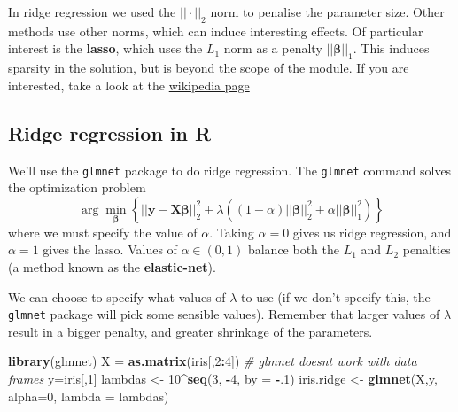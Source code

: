 \documentclass[
]{book}
\newenvironment{Shaded}{\begin{snugshade}}{\end{snugshade}}
\newcommand{\AttributeTok}[1]{\textcolor[rgb]{0.13,0.29,0.53}{#1}}
\newcommand{\CommentTok}[1]{\textcolor[rgb]{0.56,0.35,0.01}{\textit{#1}}}
\newcommand{\DecValTok}[1]{\textcolor[rgb]{0.00,0.00,0.81}{#1}}
\newcommand{\FunctionTok}[1]{\textcolor[rgb]{0.13,0.29,0.53}{\textbf{#1}}}
\newcommand{\NormalTok}[1]{#1}
\newcommand{\OtherTok}[1]{\textcolor[rgb]{0.56,0.35,0.01}{#1}}
\newcommand{\SpecialCharTok}[1]{\textcolor[rgb]{0.81,0.36,0.00}{\textbf{#1}}}
\theoremstyle{definition}
\theoremstyle{definition}
\theoremstyle{definition}
\theoremstyle{definition}
\theoremstyle{remark}
\begin{document}
In ridge regression we used the \(||\cdot||_2\) norm to penalise the parameter size. Other methods use other norms, which can induce interesting effects. Of particular interest is the \textbf{lasso}, which uses the \(L_1\) norm as a penalty \(||\boldsymbol \beta||_1\). This induces sparsity in the solution, but is beyond the scope of the module. If you are interested, take a look at the \href{https://en.wikipedia.org/wiki/Lasso_(statistics)}{wikipedia page}

\subsection{Ridge regression in R}\label{ridge-regression-in-r}

We'll use the \texttt{glmnet} package to do ridge regression. The \texttt{glmnet} command solves the optimization problem
\[\arg \min_{\boldsymbol \beta} \left\{||\mathbf y- \mathbf X\boldsymbol \beta||^2_2+\lambda \left((1-\alpha)||\boldsymbol \beta||_2^2+\alpha ||\boldsymbol \beta||_1^2\right)\right\}\]
where we must specify the value of \(\alpha\).
Taking \(\alpha=0\) gives us ridge regression, and \(\alpha=1\) gives the lasso. Values of \(\alpha \in (0,1)\) balance both the \(L_1\) and \(L_2\) penalties (a method known as the \textbf{elastic-net}).

We can choose to specify what values of \(\lambda\) to use (if we don't specify this, the \texttt{glmnet} package will pick some sensible values). Remember that larger values of \(\lambda\) result in a bigger penalty, and greater shrinkage of the parameters.

\begin{Shaded}
\begin{Highlighting}[]
\FunctionTok{library}\NormalTok{(glmnet)}
\NormalTok{X }\OtherTok{=} \FunctionTok{as.matrix}\NormalTok{(iris[,}\DecValTok{2}\SpecialCharTok{:}\DecValTok{4}\NormalTok{]) }\CommentTok{\# glmnet doesn\textquotesingle{}t work with data frames}
\NormalTok{y}\OtherTok{=}\NormalTok{iris[,}\DecValTok{1}\NormalTok{]}
\NormalTok{lambdas }\OtherTok{\textless{}{-}} \DecValTok{10}\SpecialCharTok{\^{}}\FunctionTok{seq}\NormalTok{(}\DecValTok{3}\NormalTok{, }\SpecialCharTok{{-}}\DecValTok{4}\NormalTok{, }\AttributeTok{by =} \SpecialCharTok{{-}}\NormalTok{.}\DecValTok{1}\NormalTok{)}
\NormalTok{iris.ridge }\OtherTok{\textless{}{-}} \FunctionTok{glmnet}\NormalTok{(X,y, }\AttributeTok{alpha=}\DecValTok{0}\NormalTok{, }\AttributeTok{lambda =}\NormalTok{ lambdas)}
\end{Highlighting}
\end{Shaded}
\end{document}
